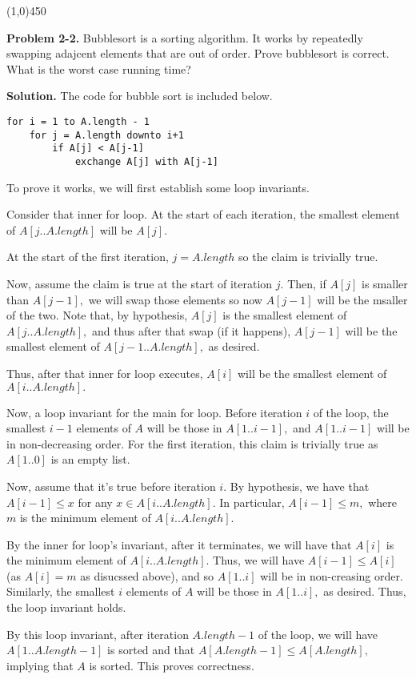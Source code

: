 \documentclass{article}
\newcommand{\prob}[2]
{\textbf{Problem #1.} #2

\textbf{Solution.}}
\newcommand{\bardiv}{\begin{center}
\line(1,0){450}
\end{center}}
\begin{document}
\bardiv

\prob{2-2}{Bubblesort is a sorting algorithm. It works by repeatedly swapping adajcent elements that are out of order.
Prove bubblesort is correct. What is the worst case running time?
}
The code for bubble sort is included below. 

\begin{lstlisting}
for i = 1 to A.length - 1
	for j = A.length downto i+1
		if A[j] < A[j-1]
			exchange A[j] with A[j-1]
\end{lstlisting}

To prove it works, we will first establish some loop invariants. 

Consider that inner for loop. At the start of each iteration, the smallest element of $A[j..A.length]$ will be $A[j].$

At the start of the first iteration, $j=A.length$ so the claim is trivially true.

Now, assume the claim is true at the start of iteration $j.$ Then, if $A[j]$ is smaller than $A[j-1],$ we will swap those elements so now $A[j-1]$ will be the msaller of the two. Note that, by hypothesis, $A[j]$ is the smallest element of $A[j..A.length],$ and thus after that swap (if it happens), $A[j-1]$ will be the smallest element of $A[j-1..A.length],$ as desired.

Thus, after that inner for loop executes, $A[i]$ will be the smallest element of $A[i..A.length].$ 

Now, a loop invariant for the main for loop. Before iteration $i$ of the loop, the smallest $i-1$ elements of $A$ will be those in $A[1..i-1],$ and $A[1..i-1]$ will be in non-decreasing order. For the first iteration, this claim is trivially true as $A[1..0]$ is an empty list.

Now, assume that it's true before iteration $i.$ By hypothesis, we have that $A[i-1] \leq x$ for any $x \in A[i..A.length].$ In particular, $A[i-1] \leq m,$ where $m$ is the minimum element of $A[i..A.length].$

By the inner for loop's invariant, after it terminates, we will have that $A[i]$ is the minimum element of $A[i..A.length].$ Thus, we will have $A[i-1] \leq A[i]$ (as $A[i] = m$ as disucssed above), and so $A[1..i]$ will be in non-creasing order. Similarly, the smallest $i$ elements of $A$ will be those in $A[1..i],$ as desired. Thus, the loop invariant holds.

By this loop invariant, after iteration $A.length - 1$ of the loop, we will have $A[1..A.length-1]$ is sorted and that $A[A.length-1] \leq A[A.length],$ implying that $A$ is sorted. This proves correctness.
\end{document}
